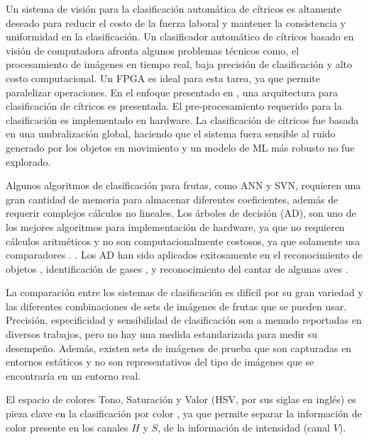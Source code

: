 \documentclass[twoside,spanish,ESP,MSc]{plantillaLabUPV}
\theoremstyle{definition}
\begin{document}




Un sistema de visión para la clasificación automática de cítricos es altamente deseado para reducir el costo de la fuerza laboral y mantener la consistencia y uniformidad en la clasificación. Un clasificador automático de cítricos basado en visión de computadora afronta algunos problemas técnicos como, el procesamiento de imágenes en tiempo real, baja precisión de clasificación y alto costo computacional. Un FPGA es ideal para esta tarea, ya que permite paralelizar operaciones. En el enfoque presentado en \cite{josu}, una arquitectura para clasificación de cítricos es presentada. El pre-procesamiento requerido para la clasificación es implementado en hardware. La clasificación de cítricos fue basada en una umbralización global, haciendo que el sistema fuera sensible al ruido generado por los objetos en movimiento y un modelo de ML más robusto no fue explorado.



Algunos algoritmos de clasificación para frutas, como ANN y SVN, requieren una gran cantidad de memoria para almacenar diferentes coeficientes, además de requerir complejos cálculos no lineales. Los árboles de decisión (AD), son uno de los mejores algoritmos para implementación de hardware, ya que no requieren cálculos aritméticos y no son computacionalmente costosos, ya que solamente usa comparadores \cite{6636881}. . Los AD han sido aplicados exitosamente en el reconocimiento de objetos \cite{10.1007/978-3-540-32256-6_52}, identificación de gases \cite{li}, y reconocimiento del cantar de algunas aves \cite{5986215}.



La comparación entre los sistemas de clasificación es difícil por su gran variedad y las diferentes combinaciones de sets de imágenes de frutas que se pueden usar. Precisión, especificidad y sensibilidad de clasificación son a menudo reportadas en diversos trabajos, pero no hay una medida estandarizada para medir su desempeño. Además, existen sets de imágenes de prueba que son capturadas en entornos estáticos y no son representativos del tipo de imágenes que se encontraría en un entorno real.



El espacio de colores Tono, Saturación y Valor (HSV, por sus siglas en inglés) es pieza clave en la clasificación por color \cite{analis,chokun,rgbhisto,huehue,sugarhue}, ya que permite separar la información de color presente en los canales $H$ y $S$, de la información de intensidad (canal $V$).
\end{document}
